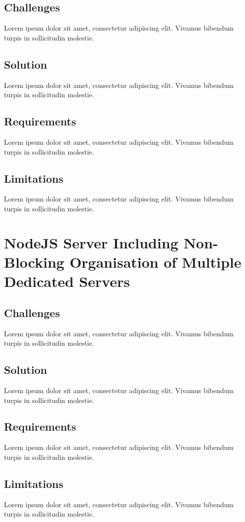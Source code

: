 \documentclass[11pt, a4paper]{article}
\begin{document}
\subsection{Challenges}
Lorem ipsum dolor sit amet, consectetur adipiscing elit. Vivamus bibendum turpis in sollicitudin
molestie.

\subsection{Solution}
Lorem ipsum dolor sit amet, consectetur adipiscing elit. Vivamus bibendum turpis in sollicitudin
molestie.

\subsection{Requirements}
Lorem ipsum dolor sit amet, consectetur adipiscing elit. Vivamus bibendum turpis in sollicitudin
molestie.

\subsection{Limitations}
Lorem ipsum dolor sit amet, consectetur adipiscing elit. Vivamus bibendum turpis in sollicitudin
molestie.

\section{NodeJS Server Including Non-Blocking Organisation of Multiple Dedicated Servers}
\subsection{Challenges}
Lorem ipsum dolor sit amet, consectetur adipiscing elit. Vivamus bibendum turpis in sollicitudin
molestie.

\subsection{Solution}
Lorem ipsum dolor sit amet, consectetur adipiscing elit. Vivamus bibendum turpis in sollicitudin
molestie.

\subsection{Requirements}
Lorem ipsum dolor sit amet, consectetur adipiscing elit. Vivamus bibendum turpis in sollicitudin
molestie.

\subsection{Limitations}
Lorem ipsum dolor sit amet, consectetur adipiscing elit. Vivamus bibendum turpis in sollicitudin
molestie.
\end{document}
